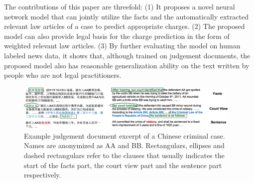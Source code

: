 

The contributions of this paper are threefold: 
(1) It proposes a novel neural network model that can jointly utilize the facts and the automatically extracted relevant law articles of a case to predict appropriate charges.
(2) The proposed model can also provide legal basis for the charge prediction in the form of weighted relevant law articles.
(3) By further evaluating the model on human labeled news data, it shows that, although trained on judgement documents, the proposed model also has reasonable generalization ability on the text written by people who are not legal practitioners.


\begin{figure}[t!]
\begin{center}
\includegraphics[width=0.97\textwidth]{figures/case.png}	
\caption{Example judgement document excerpt of a Chinese criminal case. Names are anonymized as AA and BB.
Rectangulars, ellipses and dashed rectangulars refer to the clauses that usually indicates the start of the facts part, the court view part and the sentence part respectively.
}
\label{fig_example_case}
\end{center}
\end{figure}
